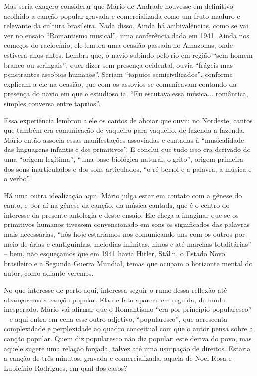 Mas seria exagero considerar que Mário de Andrade houvesse em definitivo
acolhido a canção popular gravada e comercializada como um fruto maduro
e relevante da cultura brasileira. Nada disso. Ainda há ambivalências,
como se vai ver no ensaio ``Romantismo musical'', uma conferência dada
em 1941. Ainda nos começos do raciocínio, ele lembra uma ocasião passada
no Amazonas, onde estivera anos antes. Lembra que, o navio subindo pelo
rio em região ``sem homem branco ou seringais'', quer dizer sem presença
ocidental, ouvia ``frágeis mas penetrantes assobios humanos''. Seriam
``tapuios semicivilizados'', conforme explicam a ele na ocasião, que com
os assovios se comunicavam contando da presença do navio em que o
estudioso ia. ``Eu escutava essa música... romântica, simples conversa
entre tapuios''.

Essa experiência lembrou a ele os cantos de aboiar que ouviu no
Nordeste, cantos que também era comunicação de vaqueiro para vaqueiro,
de fazenda a fazenda. Mário então associa essas manifestações assoviadas
e cantadas à ``musicalidade das linguagens infantis e dos primitivos''.
E conclui que tudo isso era derivado de uma ``origem legítima'', ``uma
base biológica natural, o grito'', origem primeira dos sons
inarticulados e dos sons articulados, ``o ré bemol e a palavra, a música
e o verbo''.

Há uma outra idealização aqui: Mário julga estar em contato com a gênese
do canto, e por aí na gênese da canção, da música cantada, que é o
centro do interesse da presente antologia e deste ensaio. Ele chega a
imaginar que se os primitivos humanos tivessem convencionado em sons os
significados das palavras mais necessárias, ``nós hoje estaríamos nos
comunicando uns com os outros por meio de árias e cantiguinhas, melodias
infinitas, hinos e até marchas totalitárias'' -- bem, não esqueçamos que
em 1941 havia Hitler, Stálin, o Estado Novo brasileiro e a Segunda
Guerra Mundial, temas que ocupam o horizonte mental do autor, como
adiante veremos.

No que interesse de perto aqui, interessa seguir o rumo dessa reflexão
até alcançarmos a canção popular. Ela de fato aparece em seguida, de
modo inesperado. Mário vai afirmar que o Romantismo ``era por princípio
popularesco'' -- e aqui entra em cena esse outro adjetivo,
``popularesco'', que acrescenta complexidade e perplexidade ao quadro
conceitual com que o autor pensa sobre a canção popular. Quem diz
popularesco não diz popular: este deriva do povo, mas aquele sugere uma
relação forçada, talvez até uma usurpação de direitos. Estaria a canção
de três minutos, gravada e comercializada, aquela de Noel Rosa e
Lupicínio Rodrigues, em qual dos casos?

